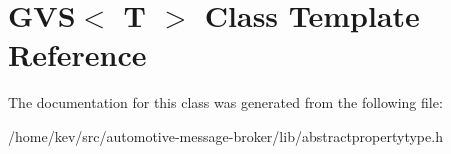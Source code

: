 \hypertarget{classGVS}{\section{G\-V\-S$<$ T $>$ Class Template Reference}
\label{classGVS}
}


The documentation for this class was generated from the following file\-:\begin{DoxyCompactItemize}
\item 
/home/kev/src/automotive-\/message-\/broker/lib/abstractpropertytype.\-h\end{DoxyCompactItemize}
